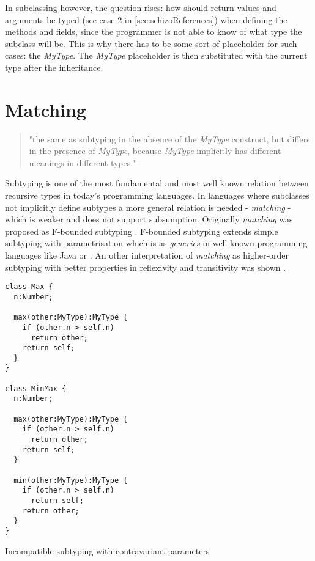 In subclassing however, the question rises: how should return values
and arguments be typed (see case 2 in \ref{sec:schizoReferences})
when defining the methods and fields, since the programmer is not able
to know of what type the subclass will be. This is why there has to
be some sort of placeholder for such cases: the \emph{MyType}. The
\emph{MyType} placeholder is then substituted with the current type
after the inheritance.


\chapter{Matching}
\begin{quotation}
"the same as subtyping in the absence of the \emph{MyType}
construct, but differs in the presence of \emph{MyType}, because
\emph{MyType} implicitly has different meanings in different types." -
\cite{bruce_foundations_2002}
\end{quotation}

Subtyping is one of the most fundamental and most well known relation
between recursive types in today's programming languages. In languages
where subclasses not implicitly define subtypes a more general
relation is needed - \emph{matching} - which is weaker and does
not support subsumption. Originally \emph{matching} was proposed
as F-bounded subtyping \cite{canning_f-bounded_1989}. F-bounded
subtyping extends simple subtyping with parametrisation which is as
\emph{generics} in well known programming languages like Java or \CS
\cite{barron-estrada_inheritance_2003}. An other interpretation of
\emph{matching} as higher-order subtyping with better properties in
reflexivity and transitivity was shown \cite{abadi_subtyping_1996}.



\begin{listing}
\begin{lstlisting}
class Max {
  n:Number;

  max(other:MyType):MyType {
    if (other.n > self.n)
      return other;
    return self;
  }
}

class MinMax {
  n:Number;

  max(other:MyType):MyType {
    if (other.n > self.n)
      return other;
    return self;
  }

  min(other:MyType):MyType {
    if (other.n > self.n)
      return self;
    return other;
  }
}
\end{lstlisting}
\caption{Incompatible subtyping with contravariant parameters}
\label{fig:minmax-example}
\end{listing}

